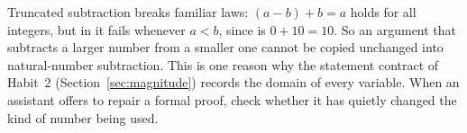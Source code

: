 Truncated subtraction breaks familiar laws: $(a-b)+b=a$ holds for all integers, but in  it fails whenever $a<b$, since  is $0+10=10$. So an argument that subtracts a larger number from a smaller one cannot be copied unchanged into natural-number subtraction. This is one reason why the statement contract of Habit~2 (Section~\ref{sec:magnitude}) records the domain of every variable. When an assistant offers to repair a formal proof, check whether it has quietly changed the kind of number being used.
